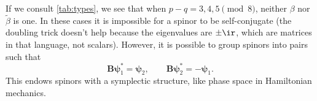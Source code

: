 \documentclass[11pt]{article}
\renewcommand{\S}{\mathbf{S}}
\newcommand{\B}{\mathbf{B}}
\newcommand{\Bt}{\widetilde{\mathbf{B}}}
\newcommand{\psib}{\boldsymbol{\psi}}
\newcommand{\Omegab}{\boldsymbol{\Omega}}
\newcommand{\betat}{\tilde{\beta}}
\begin{document}
If we consult \cref{tab:types}, we see that when \( p-q = 3,4,5 \pmod 8 \), neither $\beta$ nor $\betat$ is one.
In these cases it is impossible for a spinor to be self-conjugate
(the doubling trick doesn't help because the eigenvalues are $\pm\ir$, which are matrices in that language, not scalars).
However, it is possible to group spinors into pairs such that
%
\begin{equation}\label{eq:pseudomajorana}
  \B \psib_1^\ast = \psib_2,
  \qquad
  \B \psib_2^\ast = -\psib_1.
\end{equation}
%
This endows spinors with a symplectic structure, like phase space in Hamiltonian mechanics.
\end{document}
